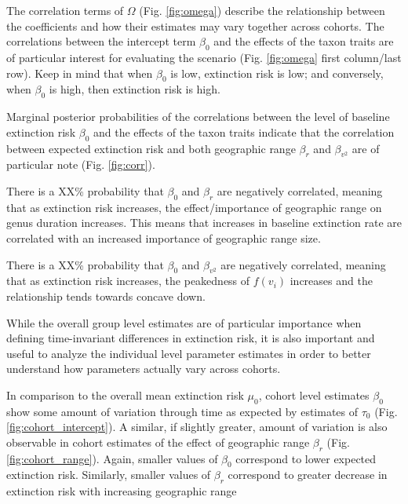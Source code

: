 \documentclass[12pt,letterpaper]{article}
\begin{document}
The correlation terms of \(\Omega\) (Fig. \ref{fig:omega}) describe the relationship between the coefficients and how their estimates may vary together across cohorts. The correlations between the intercept term \(\beta_{0}\) and the effects of the taxon traits are of particular interest for evaluating the \citet{Jablonski1986} scenario (Fig. \ref{fig:omega} first column/last row). Keep in mind that when \(\beta_{0}\) is low, extinction risk is low; and conversely, when \(\beta_{0}\) is high, then extinction risk is high.

Marginal posterior probabilities of the correlations between the level of baseline extinction risk \(\beta_{0}\) and the effects of the taxon traits indicate that the correlation between expected extinction risk and both geographic range \(\beta_{r}\) and \(\beta_{v^{2}}\) are of particular note (Fig. \ref{fig:corr}). 

There is a XX\% probability that \(\beta_{0}\) and \(\beta_{r}\) are negatively correlated, meaning that as extinction risk increases, the effect/importance of geographic range on genus duration increases. This means that increases in baseline extinction rate are correlated with an increased importance of geographic range size. 

There is a XX\% probability that \(\beta_{0}\) and \(\beta_{v^{2}}\) are negatively correlated, meaning that as extinction risk increases, the peakedness of \(f(v_{i})\) increases and the relationship tends towards concave down.

While the overall group level estimates are of particular importance when defining time-invariant differences in extinction risk, it is also important and useful to analyze the individual level parameter estimates in order to better understand how parameters actually vary across cohorts.

In comparison to the overall mean extinction risk \(\mu_{0}\), cohort level estimates \(\beta_{0}\) show some amount of variation through time as expected by estimates of \(\tau_{0}\) (Fig. \ref{fig:cohort_intercept}). A similar, if slightly greater, amount of variation is also observable in cohort estimates of the effect of geographic range \(\beta_{r}\) (Fig. \ref{fig:cohort_range}). Again, smaller values of \(\beta_{0}\) correspond to lower expected extinction risk. Similarly, smaller values of \(\beta_{r}\) correspond to greater decrease in extinction risk with increasing geographic range 
\end{document}

